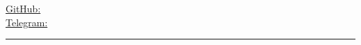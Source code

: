 \begin{center}
	\HeaderRect
	\begin{minipage}[b]{.3\textwidth}
	\raggedright
	{\city} \\ %
	\href{mailto:\email}{\email} %
	\end{minipage}%
	\begin{minipage}[b]{.4\textwidth}
	\makeatletter
	\centering {\Huge \@author} \\
	\makeatother
    \vspace{.5em}
    {\color{highlight} \Large{\role}}
	\end{minipage}%
	\begin{minipage}[b]{.3\textwidth}
	\raggedleft 
	\href{https://github.com/\github}{GitHub: \github} \\%
	\href{https://t.me/\LinkedIn}{Telegram: \LinkedIn} 
	\end{minipage}
	\vspace{-2mm}

{\color{highlight} \hrule}
\end{center}